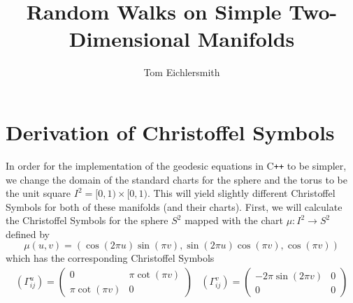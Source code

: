 \documentclass{article}
\title{Random Walks on Simple Two-Dimensional Manifolds}
\author{Tom Eichlersmith}
\begin{document}
\section{Derivation of Christoffel Symbols}

In order for the implementation of the geodesic equations in C\texttt{++} to be simpler, we change the domain of the standard charts for the sphere and the torus to be the unit square $I^2 = [0,1) \times [0,1)$.
This will yield slightly different Christoffel Symbols for both of these manifolds (and their charts).
First, we will calculate the Christoffel Symbols for the sphere $S^2$ mapped with the chart $\mu:I^2 \to S^2$ defined by
$$ \mu(u,v) = (\cos(2\pi u)\sin(\pi v), \sin(2\pi u)\cos(\pi v), \cos(\pi v)) $$
which has the corresponding Christoffel Symbols
\begin{equation}
\begin{array}{lr}
	\left(\Gamma^{u}_{ij}\right) = \left( \begin{array}{cc}
		0 & \pi\cot(\pi v) \\
		\pi\cot(\pi v) & 0
	\end{array} \right) &
	\left(\Gamma^{v}_{ij}\right) = \left( \begin{array}{cc}
		-2\pi\sin(2\pi v) & 0 \\
		0 & 0
	\end{array} \right)
\end{array}
\end{equation}
\end{document}
